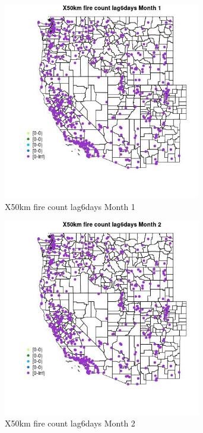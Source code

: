 \begin{figure} 
\centering  
\includegraphics[width=0.77\textwidth]{Code_Outputs/Report_ML_input_PM25_Step4_part_e_de_duplicated_aves_compiled_2019-05-14wNAs_MapObsMo1X50km_fire_count_lag6days.jpg} 
\caption{\label{fig:Report_ML_input_PM25_Step4_part_e_de_duplicated_aves_compiled_2019-05-14wNAsMapObsMo1X50km_fire_count_lag6days}X50km fire count lag6days Month 1} 
\end{figure} 
 

\begin{figure} 
\centering  
\includegraphics[width=0.77\textwidth]{Code_Outputs/Report_ML_input_PM25_Step4_part_e_de_duplicated_aves_compiled_2019-05-14wNAs_MapObsMo2X50km_fire_count_lag6days.jpg} 
\caption{\label{fig:Report_ML_input_PM25_Step4_part_e_de_duplicated_aves_compiled_2019-05-14wNAsMapObsMo2X50km_fire_count_lag6days}X50km fire count lag6days Month 2} 
\end{figure} 
 

